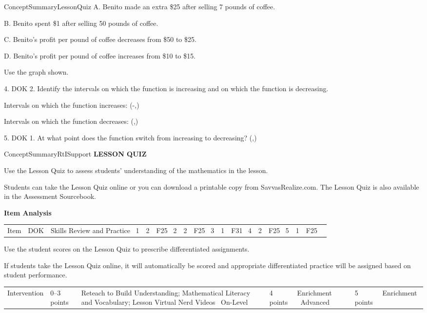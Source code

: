 \documentclass{article}
\newenvironment{te-addendum}[2]{}{}     %
\newcommand{\answer}[1]{}               %
\newcommand{\placeholder}[2]{}          %
\begin{document}
\begin{te-addendum}{ConceptSummary}{LessonQuiz}
A. Benito made an extra \$25 after selling 7 pounds of coffee.

B. Benito spent \$1 after selling 50 pounds of coffee.

C. Benito's profit per pound of coffee decreases from \$50 to \$25.

D. Benito's profit per pound of coffee increases from \$10 to \$15.
\answer{3. D. Benito's profit per pound of coffee increases from \$10 to \$15.}

Use the graph shown.

\placeholder{graph}{Quiz items 4--5: black downward-opening parabola with vertex (1,4), x-intercepts (-1,0) and (3,0), and y-intercept (0,3). Horizontal axis (x) labeled -2, 0, 2, 4; vertical axis (y) labeled -4, -2, 2, 4. Unit grid visible approximately x=-2 to 5 and y=-6 to 6; arrowheads point down on both branches.}

4. DOK 2. Identify the intervals on which the function is increasing and on which the function is decreasing.

Intervals on which the function increases: (-\infty,\square)

Intervals on which the function decreases: (\square,\infty)
\answer{4. Increases: (-\infty,1); decreases: (1,\infty).}

5. DOK 1. At what point does the function switch from increasing to decreasing? (\square,\square)
\answer{5. (1,4).}
\end{te-addendum}

\begin{te-addendum}{ConceptSummary}{RtISupport}
\textbf{LESSON QUIZ}

Use the Lesson Quiz to assess students' understanding of the mathematics in the lesson.

Students can take the Lesson Quiz online or you can download a printable copy from SavvasRealize.com. The Lesson Quiz is also available in the Assessment Sourcebook.

\textbf{Item Analysis}
\begin{tabular}{lll}
Item & DOK & Skills Review and Practice \
1 & 2 & F25 \
2 & 2 & F25 \
3 & 1 & F31 \
4 & 2 & F25 \
5 & 1 & F25 \
\end{tabular}

Use the student scores on the Lesson Quiz to prescribe differentiated assignments.

If students take the Lesson Quiz online, it will automatically be scored and appropriate differentiated practice will be assigned based on student performance.

\begin{tabular}{lll}
Intervention & 0--3 points & Reteach to Build Understanding; Mathematical Literacy and Vocabulary; Lesson Virtual Nerd Videos \
On-Level & 4 points & Enrichment \
Advanced & 5 points & Enrichment \
\end{tabular}
\end{te-addendum}
\end{document}
